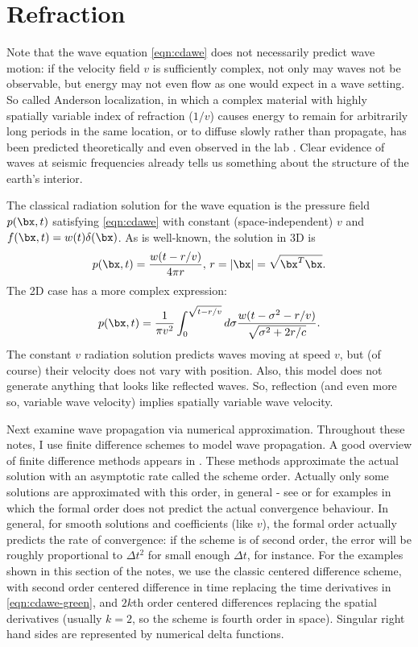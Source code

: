 \section{Refraction}
Note that the wave equation \ref{eqn:cdawe} does not necessarily predict wave motion: if the velocity field $v$ is sufficiently complex, not only may waves not be observable, but energy may not even flow as one would expect in a wave setting. So called Anderson localization, in which a complex material with highly spatially variable index of refraction ($1/v$) causes energy to remain for arbitrarily long periods in the same location, or to diffuse slowly rather than propagate, has been predicted theoretically and even observed in the lab \cite[]{huetal:08,WrightWeaver:10}. Clear evidence of waves at seismic frequencies already tells us something about the structure of the earth's interior.

The classical radiation solution for the wave equation \cite[]{CourHil:62} is the pressure field $p(\bx,t)$ satisfying \ref{eqn:cdawe} with constant (space-independent) $v$ and $f(\bx,t) = w(t)\delta(\bx)$. As is well-known, the solution in 3D is
\begin{equation}
\label{eqn:cdawe-green}
p(\bx,t) = \frac{w(t-r/v)}{4\pi r}, \,r=|\bx| = \sqrt{\bx^T\bx}.
\end{equation}
The 2D case has a more complex expression:
\begin{equation}\label{eqn:acdsol2dalt}
p(\bx,t)=\frac{1}{\pi v^2} \int_0^{\sqrt{t-r/v}}d\sigma \frac{w(t-\sigma^2-r/v)}{\sqrt{\sigma^2 + 2r/c}}. 
\end{equation}
The constant $v$ radiation solution predicts waves moving at speed $v$, but (of course) their velocity does not vary with position. Also, this model does not generate anything that looks like reflected waves. So, reflection (and even more so, variable wave velocity) implies spatially variable wave velocity.

Next examine wave propagation via numerical approximation. Throughout these notes, I use finite difference schemes to model wave propagation. A good overview of finite difference methods appears in \cite[]{Moczoetal:06}. These methods approximate the actual solution with an asymptotic rate called the scheme order. Actually only some solutions are approximated with this order, in general - see \cite[]{SymesTerentyevVdovina:08} or \cite[]{SymesVdovina:09} for examples in which the formal order does not predict the actual convergence behaviour. In general, for smooth solutions and coefficients (like $v$), the formal order actually predicts the rate of convergence: if the scheme is of second order, the error will be roughly proportional to $\Delta t^2$ for small enough $\Delta t$, for instance. For the examples shown in this section of the notes, we use the classic centered difference scheme, with second order centered difference in time replacing the time derivatives in \ref{eqn:cdawe-green}, and $2k$th order centered differences replacing the spatial derivatives (usually $k=2$, so the scheme is fourth order in space). Singular right hand sides are represented by numerical delta functions.

